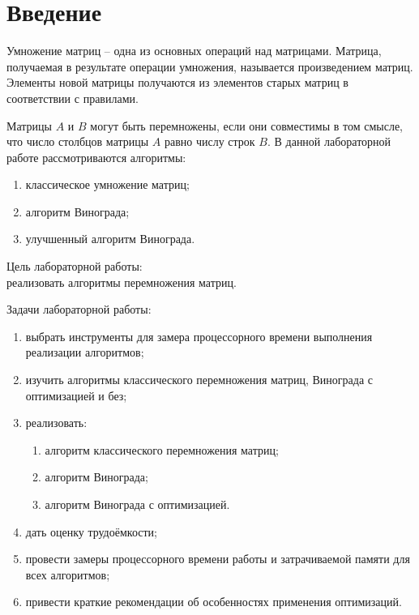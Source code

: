 \section*{\large Введение}

\par Умножение матриц -- одна из основных операций над матрицами. Матрица, получаемая в результате операции умножения, называется произведением матриц. Элементы новой матрицы получаются из элементов старых матриц в соответствии с правилами.
\par Матрицы \begin{math}A\end{math} и \begin{math}B\end{math} могут быть перемножены, если они совместимы в том смысле, что число столбцов матрицы \begin{math}A\end{math} равно числу строк \begin{math}B\end{math}.
	В данной лабораторной работе рассмотриваются алгоритмы:

	\begin{enumerate}
		\item классическое умножение матриц;
		\item алгоритм Винограда;
		\item улучшенный алгоритм Винограда.
	\end{enumerate}

	Цель лабораторной работы:\\
	реализовать алгоритмы перемножения матриц.

	Задачи лабораторной работы:
	\begin{enumerate}
		\item выбрать инструменты для замера процессорного времени выполнения реализации алгоритмов;
		\item изучить алгоритмы классического перемножения матриц, Винограда с оптимизацией и без;
		\item реализовать:
		\begin{enumerate}
			\item алгоритм классического перемножения матриц;
			\item алгоритм Винограда;
			\item алгоритм Винограда с оптимизацией.
		\end{enumerate}
		\item дать оценку трудоёмкости;
		\item провести замеры процессорного времени работы  и затрачиваемой памяти для всех алгоритмов;
		\item привести краткие рекомендации об особенностях применения оптимизаций.
	\end{enumerate}
\newpage